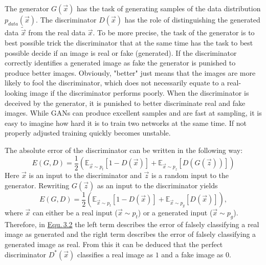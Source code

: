 The generator $G(\vec{x})$ has the task of generating samples of the data distribution $p_{data}(\vec{x})$. The discriminator $D(\vec{x})$ has the role of distinguishing the generated data $\tilde{\vec{x}}$ from the real data $\vec{x}$. To be more precise, the task of the generator is to best possible trick the discriminator that at the same time has the task to best possible decide if an image is real or fake (generated). If the discriminator correctly identifies a generated image as fake the generator is punished to produce better images. Obviously, "better" just means that the images are more likely to fool the discriminator, which does not necessarily equate to a real-looking image if the discriminator performs poorly. When the discriminator is deceived by the generator, it is punished to better discriminate real and fake images. While GANs can produce excellent samples and are fast at sampling, it is easy to imagine how hard it is to train two networks at the same time. If not properly adjusted training quickly becomes unstable.

The absolute error of the discriminator can be written in the following way:
%
\begin{equation}
    E(G,D)=\frac{1}{2}\left(\mathbb{E}_{\vec{x}\sim p_{t}}[1-D(\vec{x})]+\mathbb{E}_{\vec{x}\sim p_{z}}[D(G(\vec{z}))]\right)
\end{equation}
%
Here $\vec{x}$ is an input to the discriminator and $\vec{z}$ is a random input to the generator. Rewriting $G(\vec{z})$ as an input to the discriminator yields
%
\begin{equation} \label{equ:3.2}
    E(G,D)=\frac{1}{2}\left(\mathbb{E}_{\vec{x}\sim p_{t}}[1-D(\vec{x})]+\mathbb{E}_{\vec{x}\sim p_{g}}[D(\vec{x})]\right),
\end{equation}
%
where $\vec{x}$ can either be a real input ($\vec{x}\sim p_t$) or a generated input ($\vec{x}\sim p_g$). Therefore, in \hyperref[equ:3.2]{Equ.\,3.2} the left term describes the error of falsely classifying a real image as generated and the right term describes the error of falsely classifying a generated image as real. From this it can be deduced that the perfect discriminator $D^*(\vec{x})$ classifies a real image as $1$ and a fake image as $0$. 

